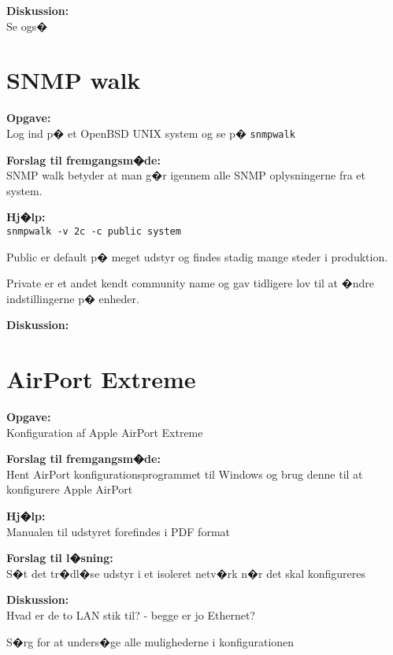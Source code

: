 \documentclass[a4paper,11pt,notitlepage]{oevelser}
\begin{document}
{\bfseries Diskussion:}\\
Se ogs� 





\chapter{SNMP walk}
\label{ex:snmpwalk}

{\bfseries Opgave:}\\
Log ind p� et OpenBSD UNIX system og se p� \verb+snmpwalk+

{\bfseries Forslag til fremgangsm�de:}\\
SNMP walk betyder at man g�r igennem alle SNMP oplysningerne fra et system.

{\bfseries Hj�lp:}\\
\verb+snmpwalk -v 2c -c public system+

Public er default p� meget udstyr og findes stadig mange steder i produktion.

Private er et andet kendt community name og gav tidligere lov til at �ndre indstillingerne p� enheder.

{\bfseries Diskussion:}\\



\chapter{AirPort Extreme}
\label{ex:AirPort-AP}

{\bfseries Opgave:}\\
Konfiguration af Apple AirPort Extreme

{\bfseries Forslag til fremgangsm�de:}\\
Hent AirPort konfigurationsprogrammet til Windows og
brug denne til at konfigurere Apple AirPort

{\bfseries Hj�lp:}\\
Manualen til udstyret forefindes i PDF format

{\bfseries Forslag til l�sning:}\\
S�t det tr�dl�se udstyr i et isoleret netv�rk n�r det skal konfigureres

{\bfseries Diskussion:}\\
Hvad er de to LAN stik til? - begge er jo Ethernet?

S�rg for at unders�ge alle mulighederne i konfigurationen
\end{document}
